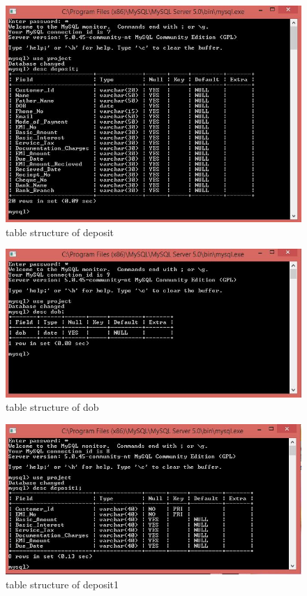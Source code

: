 \begin{figure}[ht]
\begin{center}
\includegraphics[scale=0.5]{images/t3.jpg}
\end{center}
\caption{table structure of deposit}
\label{table structure of deposit}
\end{figure}


\begin{figure}[ht]
\begin{center}
\includegraphics[scale=0.5]{images/t4.jpg}
\end{center}
\caption{table structure of dob}
\label{table structure of dob}
\end{figure}


\begin{figure}[ht]
\begin{center}
\includegraphics[scale=0.5]{images/t5.jpg}
\end{center}
\caption{table structure of deposit1}
\label{table structure of deposit1}
\end{figure}


